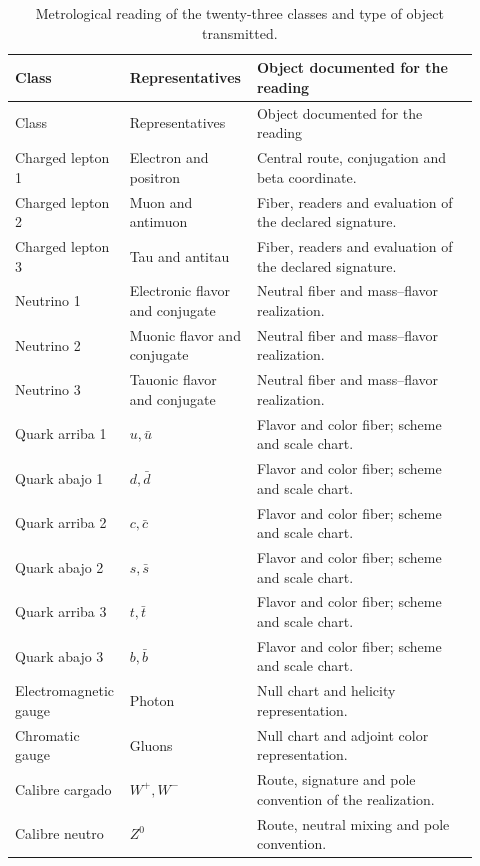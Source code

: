 \begingroup
\small
\setlength{\tabcolsep}{3pt}
\begin{longtable}{p{0.20\linewidth}p{0.25\linewidth}p{0.47\linewidth}}
\caption{Metrological reading of the twenty-three classes and type of object transmitted.}
\label{vi:tab:vi-clases-metrologia}\\
\toprule
Class & Representatives & Object documented for the reading\\
\midrule
\endfirsthead
\toprule
Class & Representatives & Object documented for the reading\\
\midrule
\endhead
\bottomrule
\endfoot
Charged lepton 1 & Electron and positron & Central route, conjugation and beta coordinate.\\
Charged lepton 2 & Muon and antimuon & Fiber, readers and evaluation of the declared signature.\\
Charged lepton 3 & Tau and antitau & Fiber, readers and evaluation of the declared signature.\\
Neutrino 1 & Electronic flavor and conjugate & Neutral fiber and mass--flavor realization.\\
Neutrino 2 & Muonic flavor and conjugate & Neutral fiber and mass--flavor realization.\\
Neutrino 3 & Tauonic flavor and conjugate & Neutral fiber and mass--flavor realization.\\
Quark arriba 1 & \(u,\bar u\) & Flavor and color fiber; scheme and scale chart.\\
Quark abajo 1 & \(d,\bar d\) & Flavor and color fiber; scheme and scale chart.\\
Quark arriba 2 & \(c,\bar c\) & Flavor and color fiber; scheme and scale chart.\\
Quark abajo 2 & \(s,\bar s\) & Flavor and color fiber; scheme and scale chart.\\
Quark arriba 3 & \(t,\bar t\) & Flavor and color fiber; scheme and scale chart.\\
Quark abajo 3 & \(b,\bar b\) & Flavor and color fiber; scheme and scale chart.\\
Electromagnetic gauge & Photon & Null chart and helicity representation.\\
Chromatic gauge & Gluons & Null chart and adjoint color representation.\\
Calibre cargado & \(W^+,W^-\) & Route, signature and pole convention of the realization.\\
Calibre neutro & \(Z^0\) & Route, neutral mixing and pole convention.\\

\end{longtable}
